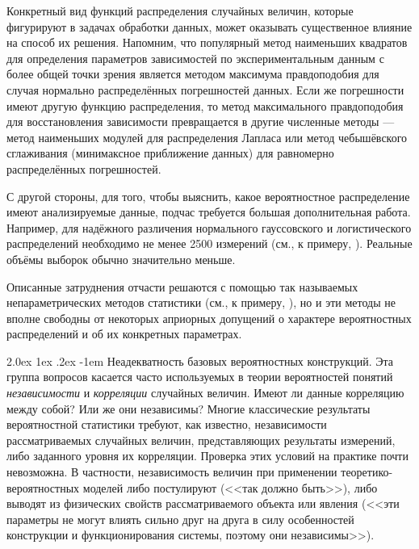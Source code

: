 \documentclass[a5paper,openany]{book}
\makeatletter
\renewcommand\paragraph{\@startsection{paragraph}{4}{\z@}%
                         {2.0ex \@plus1ex \@minus.2ex}%
                         {-1em}%
                         {\normalfont\normalsize\bfseries}}
\makeatother
\begin{document}
Конкретный вид функций распределения случайных величин, которые фигурируют в задачах 
обработки данных, может оказывать существенное влияние на способ их решения. Напомним, 
что популярный метод наименьших квадратов для определения параметров зависимостей 
по экспериментальным данным с более общей точки зрения является методом максимума 
правдоподобия для случая нормально распределённых погрешностей данных. Если же 
погрешности имеют другую функцию распределения, то метод максимального правдоподобия 
для восстановления зависимости превращается в другие численные методы --- метод 
наименьших модулей для распределения Лапласа \cite{MudrovKushko,MudrKush-LAD} или 
метод чебышёвского сглаживания (минимаксное приближение данных) для равномерно 
распределённых погрешностей. 
  
С другой стороны, для того, чтобы выяснить, какое вероятностное распределение имеют 
анализируемые данные, подчас требуется большая дополнительная работа. Например, 
для надёжного различения нормального гауссовского и логистического распределений 
необходимо не менее 2500 измерений (см., к примеру, \cite{Orlov2006}). Реальные 
объёмы выборок обычно значительно меньше. 
    
Описанные затруднения отчасти решаются с помощью так называемых непараметрических 
методов статистики (см., к примеру, \cite{FPTarasenko,CorderForeman,Wasserman}), 
но и эти методы не вполне свободны от некоторых априорных допущений о характере 
вероятностных распределений и об их конкретных параметрах.      
  
  
\paragraph{Неадекватность базовых вероятностных конструкций.} 
Эта группа вопросов касается часто используемых в теории вероятностей понятий 
\emph{независимости} и \emph{корреляции} случайных величин. Имеют ли данные 
корреляцию между собой? Или же они независимы? 
Многие классические результаты вероятностной статистики требуют, как известно, 
независимости рассматриваемых случайных величин, представляющих результаты измерений, 
либо заданного уровня их корреляции. Проверка этих условий на практике почти невозможна. 
В частности, независимость величин при применении теоретико-вероятностных моделей либо 
постулируют (<<так должно быть>>), либо выводят из физических свойств рассматриваемого 
объекта или явления (<<эти параметры не могут влиять сильно друг на друга в силу 
особенностей конструкции и функционирования системы, поэтому они независимы>>). 
    
\end{document}
